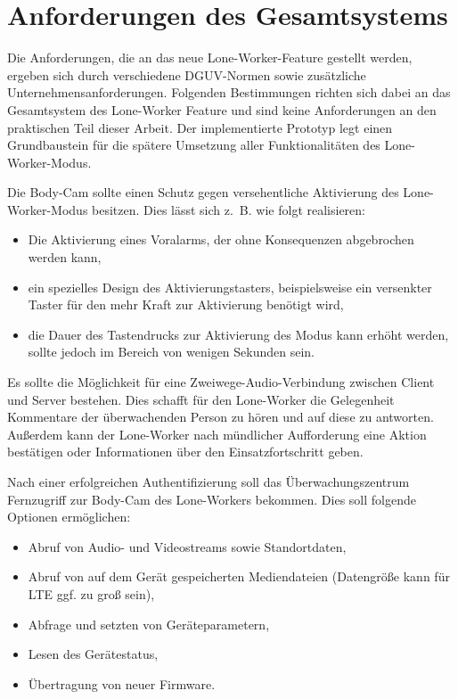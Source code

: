 \documentclass[thesis.tex]{subfiles}
\begin{document}
\section{Anforderungen des Gesamtsystems}
Die Anforderungen, die an das neue Lone-Worker-Feature gestellt werden, ergeben sich durch verschiedene DGUV-Normen sowie zusätzliche Unternehmensanforderungen.
Folgenden Bestimmungen richten sich dabei an das Gesamtsystem des Lone-Worker Feature und sind keine Anforderungen an den praktischen Teil dieser Arbeit.
Der implementierte Prototyp legt einen Grundbaustein für die spätere Umsetzung aller Funktionalitäten des Lone-Worker-Modus.

Die Body-Cam sollte einen Schutz gegen versehentliche Aktivierung des Lone-Worker-Modus besitzen.
Dies lässt sich z.~B. wie folgt realisieren:
\begin{itemize}
    \item Die Aktivierung eines Voralarms, der ohne Konsequenzen abgebrochen werden kann,
    \item ein spezielles Design des Aktivierungstasters, beispielsweise ein versenkter Taster für den mehr Kraft zur Aktivierung benötigt wird,
    \item die Dauer des Tastendrucks zur Aktivierung des Modus kann erhöht werden, sollte jedoch im Bereich von wenigen Sekunden sein.
\end{itemize}

Es sollte die Möglichkeit für eine Zweiwege-Audio-Verbindung zwischen Client und Server bestehen.
Dies schafft für den Lone-Worker die Gelegenheit Kommentare der überwachenden Person zu hören und auf diese zu antworten.
Außerdem kann der Lone-Worker nach mündlicher Aufforderung eine Aktion bestätigen oder Informationen über den Einsatzfortschritt geben.

Nach einer erfolgreichen Authentifizierung soll das Überwachungszentrum Fernzugriff zur Body-Cam des Lone-Workers bekommen.
Dies soll folgende Optionen ermöglichen:
\begin{itemize}
    \item Abruf von Audio- und Videostreams sowie Standortdaten,
    \item Abruf von auf dem Gerät gespeicherten Mediendateien (Datengröße kann für LTE ggf. zu groß sein),
    \item Abfrage und setzten von Geräteparametern,
    \item Lesen des Gerätestatus,
    \item Übertragung von neuer Firmware.
\end{itemize}
\end{document}
